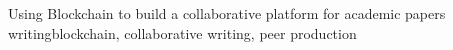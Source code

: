 \begin{englishabstract}{Using Blockchain to build a collaborative platform for academic papers writing}{blockchain, collaborative writing, peer production}

\end{englishabstract}

